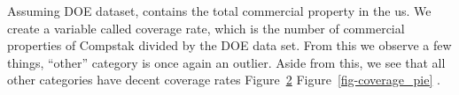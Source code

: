 \documentclass[
  12pt]{article}
\begin{document}
\begin{figure}


\caption{\label{fig-pie}}

\end{figure}%

Assuming DOE dataset, contains the total commercial property in the us.
We create a variable called coverage rate, which is the number of
commercial properties of Compstak divided by the DOE data set. From this
we observe a few things, ``other'' category is once again an outlier.
Aside from this, we see that all other categories have decent coverage
rates Figure~\ref{fig-coverage} Figure~\ref{fig-coverage_pie} .

\begin{figure}


\caption{\label{fig-coverage}}

\end{figure}%
\end{document}
